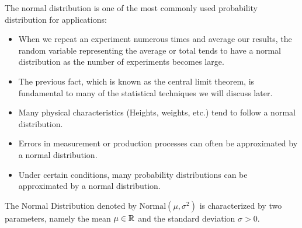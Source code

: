 \documentclass[compress]{beamer}
\begin{document}




\begin{frame}
The normal distribution is one of the most commonly used probability distribution for applications:
\begin{itemize}
\item  When we repeat an experiment numerous times and average our results, the random variable representing the average or total tends to have a normal distribution as the number of experiments becomes large.
\item   The previous fact, which is known as the central limit theorem, is fundamental to many of the statistical techniques we will discuss later.
\item  Many physical characteristics (Heights, weights, etc.) tend to follow a normal distribution.
\item  Errors in measurement or production processes can often be
approximated by a normal distribution.
\item Under certain conditions, many probability distributions can be
approximated by a normal distribution.
\end{itemize}
\end{frame}



\begin{frame}
The Normal Distribution denoted by $\text{Normal}(\mu, \sigma^2)$ is characterized by two parameters, namely the mean $\mu\in \mathbb{R}$ and the standard deviation $\sigma>0$.


\end{frame}
\end{document}
